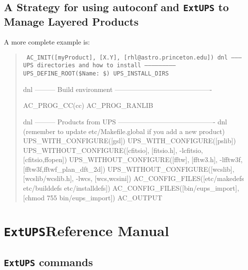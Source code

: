 \documentclass{article}
\newcommand{\code}[1]{\texttt{#1}}
\newcommand{\eups}{\code{ExtUPS}}
\begin{document}
\subsection{A Strategy for using autoconf and \eups{} to Manage Layered Products}


A more complete example is:

\begin{quote}
    \obeylines\tt\small\parskip=0pt
AC\_INIT([myProduct], [X.Y], [rhl@astro.princeton.edu])
\vspace{5pt}
dnl --------- UPS directories and how to install --------------------------
\vspace{5pt}
UPS\_DEFINE\_ROOT(\${Name}:  \$)
UPS\_INSTALL\_DIRS   
\vspace{5pt}

dnl --------- Build environment -------------------------------------------

AC\_PROG\_CC(cc)
AC\_PROG\_RANLIB

dnl --------- Products from UPS -------------------------------------------
dnl (remember to update etc/Makefile.global if you add a new product)
\vspace{5pt}
UPS\_WITH\_CONFIGURE([gsl])
UPS\_WITH\_CONFIGURE([pslib])
\vspace{5pt}
UPS\_WITHOUT\_CONFIGURE([cfitsio], [fitsio.h],
                        -lcfitsio, [cfitsio,ffopen])
UPS\_WITHOUT\_CONFIGURE([fftw],    [fftw3.h],
                        -lfftw3f,  [fftw3f,fftwf\_plan\_dft\_2d])
UPS\_WITHOUT\_CONFIGURE([wcslib],  [wcslib/wcslib.h],
                        -lwcs,     [wcs,wcsini])
\vspace{5pt}
AC\_CONFIG\_FILES([etc/makedefs etc/builddefs etc/installdefs])
AC\_CONFIG\_FILES([bin/eups\_import], [chmod 755 bin/eups\_import])
\vspace{5pt}
AC\_OUTPUT
\end{quote}

\appendix

\section{\eups Reference Manual}

\subsection{\eups{} commands}
\end{document}
